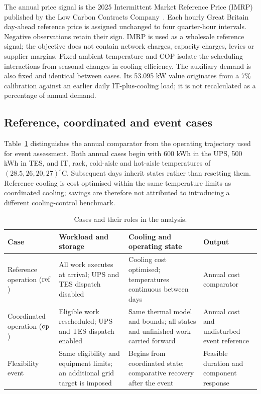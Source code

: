 The annual price signal is the 2025 Intermittent Market Reference Price (IMRP) published by the Low Carbon Contracts Company~\cite{lccc_imrp_actuals}. Each hourly Great Britain day-ahead reference price is assigned unchanged to four quarter-hour intervals. Negative observations retain their sign. IMRP is used as a wholesale reference signal; the objective does not contain network charges, capacity charges, levies or supplier margins. Fixed ambient temperature and COP isolate the scheduling interactions from seasonal changes in cooling efficiency. The auxiliary demand is also fixed and identical between cases. Its 53.095 kW value originates from a 7\% calibration against an earlier daily IT-plus-cooling load; it is not recalculated as a percentage of annual demand.

\subsection{Reference, coordinated and event cases}
Table~\ref{tab:cases} distinguishes the annual comparator from the operating trajectory used for event assessment. Both annual cases begin with 600 kWh in the UPS, 500 kWh in TES, and IT, rack, cold-aisle and hot-aisle temperatures of $(28.5,26,20,27)^{\circ}$C. Subsequent days inherit states rather than resetting them. Reference cooling is cost optimised within the same temperature limits as coordinated cooling; savings are therefore not attributed to introducing a different cooling-control benchmark.
\begin{table}[t]
\centering\caption{Cases and their roles in the analysis.}
\label{tab:cases}
\begin{tabularx}{\textwidth}{@{}lXXX@{}}\toprule
Case & Workload and storage & Cooling and operating state & Output\\\midrule
Reference operation ($\mathrm{ref}$) & All work executes at arrival; UPS and TES dispatch disabled & Cooling cost optimised; temperatures continuous between days & Annual cost comparator\\
Coordinated operation ($\mathrm{op}$) & Eligible work rescheduled; UPS and TES dispatch enabled & Same thermal model and bounds; all states and unfinished work carried forward & Annual cost and undisturbed event reference\\
Flexibility event & Same eligibility and equipment limits; an additional grid target is imposed & Begins from coordinated state; comparative recovery after the event & Feasible duration and component response\\\bottomrule
\end{tabularx}
\end{table}

